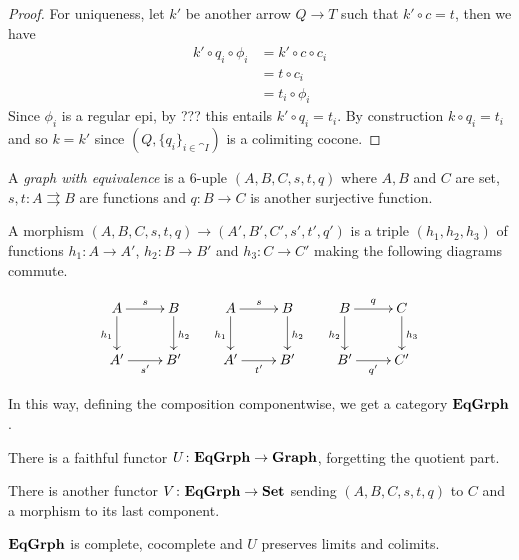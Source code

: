 {\begin{proof}
	For uniqueness, let $k'$ be another arrow $Q\to T$ such that $k'\circ c=t$, then we have
	\begin{align*}
		k'\circ q_i\circ \phi_i&=k'\circ c\circ c_i\\&=t\circ c_i\\&=t_i\circ \phi_i
	\end{align*}
	Since $\phi_i$ is a regular epi, by ??? this entails $k'\circ q_i=t_i$. By construction $k\circ q_i=t_i$ and  so $k=k'$ since $(Q, \{q_i\}_{i\in \cat{I}})$ is a colimiting cocone.
\end{proof}




\begin{definition}
	A \emph{graph with equivalence} is a 6-uple $(A, B, C, s, t, q)$ where $A, B$ and $C$ are set, $s,t\colon A\rightrightarrows B$ are functions and $q\colon B\to C$ is another surjective function.
	
	A morphism  $(A, B, C, s, t, q)\to (A', B', C', s', t', q')$ is a triple $(h_1, h_2, h_3)$ of functions $h_1\colon A\to A'$, $h_2\colon B\to B'$ and $h_3\colon C\to C'$ making the following diagrams commute.
	
	\[\xymatrix{A \ar[r]^{s} \ar[d]_{h_1} & B \ar[d]^{h_2} & A \ar[r]^{s} \ar[d]_{h_1}& B \ar[d]^{h_2} & B \ar[d]_{h_2} \ar[r]^{q} & C \ar[d]^{h_3}\\A' \ar[r]_{s'} & B' & A ' \ar[r]_{t'}& B' & B' \ar[r]_{q'} & C'}\]
	
	In this way, defining the composition componentwise, we get a category $\mathbf{EqGrph}$.
\end{definition}

\begin{remark}\label{rem:fedele}
	There is a faithful functor $U\colon \mathbf{EqGrph}\to \mathbf{Graph}$, forgetting the quotient part. 
\end{remark}

\begin{remark}
There is another functor $V\colon \mathbf{EqGrph}\to \mathbf{Set}$ sending $(A, B,C, s,t, q)$ to $C$ and a morphism to its last component.	
\end{remark}


\begin{prop}\label{prop:limits}
	$\mathbf{EqGrph}$ is complete, cocomplete and $U$ preserves limits and colimits.
\end{prop}

}
